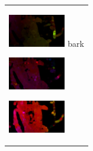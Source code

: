 \begin{figure}[htbp]
\begin{tabular}{l}
\begin{minipage}{0.165\hsize}
\begin{center}
        \end{center}
      \end{minipage}
      \begin{minipage}{0.165\hsize}
        \begin{center}
          \includegraphics[clip, width=2.5cm]{./Figures/optic_bark3.eps}
          \hspace{0.0cm} {bark}
        \end{center}
      \end{minipage}
      \begin{minipage}{0.165\hsize}
        \begin{center}
          \includegraphics[clip, width=2.5cm]{./Figures/optic_bark4.eps}
          \hspace{0.1cm} { }
        \end{center}
      \end{minipage}
      \begin{minipage}{0.165\hsize}
        \begin{center}
          \includegraphics[clip, width=2.5cm]{./Figures/optic_bark5.eps}
          \hspace{2.2cm} { }
        \end{center}
      \end{minipage}

\\ %


\end{tabular}
\end{figure}
